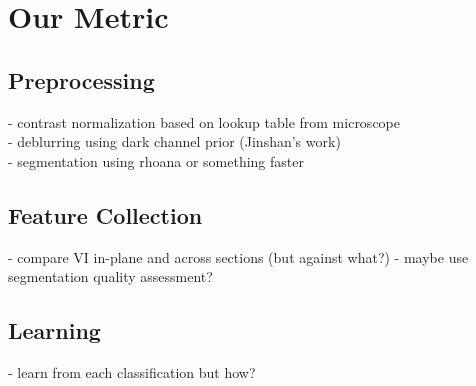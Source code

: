 \documentclass{llncs}
\begin{document}
%
%

\section{Our Metric}

\subsection{Preprocessing}
- contrast normalization based on lookup table from microscope\\
- deblurring using dark channel prior (Jinshan's work)\\
- segmentation using rhoana or something faster

\subsection{Feature Collection}
- compare VI in-plane and across sections (but against what?)
- maybe use segmentation quality assessment?


\subsection{Learning}
- learn from each classification but how?
\end{document}

